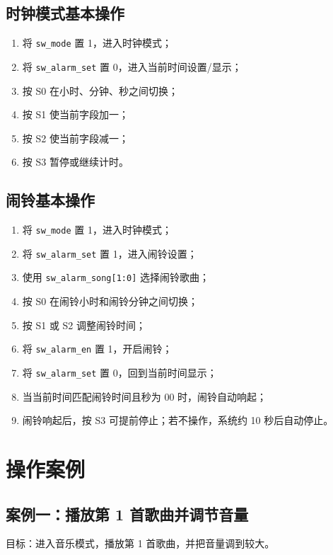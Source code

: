 \documentclass[UTF8,a4paper,12pt]{ctexart}
\newcommand{\port}[1]{\texttt{#1}}
\begin{document}
\subsection{时钟模式基本操作}

\begin{enumerate}
  \item 将 \port{sw\_mode} 置 1，进入时钟模式；
  \item 将 \port{sw\_alarm\_set} 置 0，进入当前时间设置/显示；
  \item 按 S0 在小时、分钟、秒之间切换；
  \item 按 S1 使当前字段加一；
  \item 按 S2 使当前字段减一；
  \item 按 S3 暂停或继续计时。
\end{enumerate}

\subsection{闹铃基本操作}

\begin{enumerate}
  \item 将 \port{sw\_mode} 置 1，进入时钟模式；
  \item 将 \port{sw\_alarm\_set} 置 1，进入闹铃设置；
  \item 使用 \port{sw\_alarm\_song[1:0]} 选择闹铃歌曲；
  \item 按 S0 在闹铃小时和闹铃分钟之间切换；
  \item 按 S1 或 S2 调整闹铃时间；
  \item 将 \port{sw\_alarm\_en} 置 1，开启闹铃；
  \item 将 \port{sw\_alarm\_set} 置 0，回到当前时间显示；
  \item 当当前时间匹配闹铃时间且秒为 00 时，闹铃自动响起；
  \item 闹铃响起后，按 S3 可提前停止；若不操作，系统约 10 秒后自动停止。
\end{enumerate}

\section{操作案例}

\subsection{案例一：播放第 1 首歌曲并调节音量}

目标：进入音乐模式，播放第 1 首歌曲，并把音量调到较大。
\end{document}
